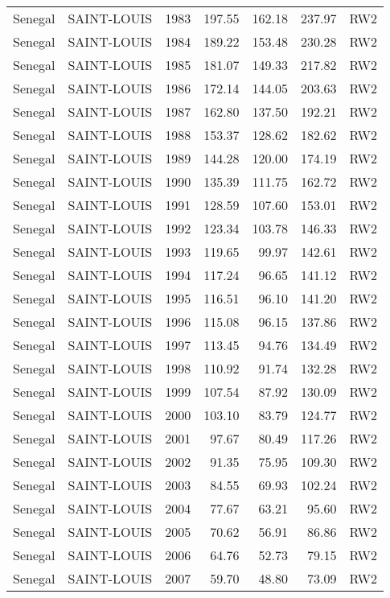 \begin{longtable}{lllrrrl}
  Senegal & SAINT-LOUIS & 1983 & 197.55 & 162.18 & 237.97 & RW2 \\ 
  Senegal & SAINT-LOUIS & 1984 & 189.22 & 153.48 & 230.28 & RW2 \\ 
  Senegal & SAINT-LOUIS & 1985 & 181.07 & 149.33 & 217.82 & RW2 \\ 
  Senegal & SAINT-LOUIS & 1986 & 172.14 & 144.05 & 203.63 & RW2 \\ 
  Senegal & SAINT-LOUIS & 1987 & 162.80 & 137.50 & 192.21 & RW2 \\ 
  Senegal & SAINT-LOUIS & 1988 & 153.37 & 128.62 & 182.62 & RW2 \\ 
  Senegal & SAINT-LOUIS & 1989 & 144.28 & 120.00 & 174.19 & RW2 \\ 
  Senegal & SAINT-LOUIS & 1990 & 135.39 & 111.75 & 162.72 & RW2 \\ 
  Senegal & SAINT-LOUIS & 1991 & 128.59 & 107.60 & 153.01 & RW2 \\ 
  Senegal & SAINT-LOUIS & 1992 & 123.34 & 103.78 & 146.33 & RW2 \\ 
  Senegal & SAINT-LOUIS & 1993 & 119.65 & 99.97 & 142.61 & RW2 \\ 
  Senegal & SAINT-LOUIS & 1994 & 117.24 & 96.65 & 141.12 & RW2 \\ 
  Senegal & SAINT-LOUIS & 1995 & 116.51 & 96.10 & 141.20 & RW2 \\ 
  Senegal & SAINT-LOUIS & 1996 & 115.08 & 96.15 & 137.86 & RW2 \\ 
  Senegal & SAINT-LOUIS & 1997 & 113.45 & 94.76 & 134.49 & RW2 \\ 
  Senegal & SAINT-LOUIS & 1998 & 110.92 & 91.74 & 132.28 & RW2 \\ 
  Senegal & SAINT-LOUIS & 1999 & 107.54 & 87.92 & 130.09 & RW2 \\ 
  Senegal & SAINT-LOUIS & 2000 & 103.10 & 83.79 & 124.77 & RW2 \\ 
  Senegal & SAINT-LOUIS & 2001 & 97.67 & 80.49 & 117.26 & RW2 \\ 
  Senegal & SAINT-LOUIS & 2002 & 91.35 & 75.95 & 109.30 & RW2 \\ 
  Senegal & SAINT-LOUIS & 2003 & 84.55 & 69.93 & 102.24 & RW2 \\ 
  Senegal & SAINT-LOUIS & 2004 & 77.67 & 63.21 & 95.60 & RW2 \\ 
  Senegal & SAINT-LOUIS & 2005 & 70.62 & 56.91 & 86.86 & RW2 \\ 
  Senegal & SAINT-LOUIS & 2006 & 64.76 & 52.73 & 79.15 & RW2 \\ 
  Senegal & SAINT-LOUIS & 2007 & 59.70 & 48.80 & 73.09 & RW2 \\ 

\end{longtable}
